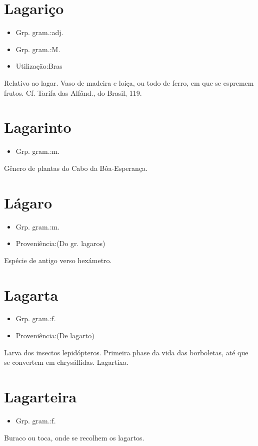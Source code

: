 \section{Lagariço}
\begin{itemize}
\item {Grp. gram.:adj.}
\end{itemize}
\begin{itemize}
\item {Grp. gram.:M.}
\end{itemize}
\begin{itemize}
\item {Utilização:Bras}
\end{itemize}
Relativo ao lagar.
Vaso de madeira e loiça, ou todo de ferro, em que se espremem frutos. Cf. \textunderscore Tarifa das Alfând.\textunderscore , do Brasil, 119.
\section{Lagarinto}
\begin{itemize}
\item {Grp. gram.:m.}
\end{itemize}
Gênero de plantas do Cabo da Bôa-Esperança.
\section{Lágaro}
\begin{itemize}
\item {Grp. gram.:m.}
\end{itemize}
\begin{itemize}
\item {Proveniência:(Do gr. \textunderscore lagaros\textunderscore )}
\end{itemize}
Espécie de antigo verso hexámetro.
\section{Lagarta}
\begin{itemize}
\item {Grp. gram.:f.}
\end{itemize}
\begin{itemize}
\item {Proveniência:(De \textunderscore lagarto\textunderscore )}
\end{itemize}
Larva dos insectos lepidópteros.
Primeira phase da vida das borboletas, até que se convertem em chrysállidas.
Lagartixa.
\section{Lagarteira}
\begin{itemize}
\item {Grp. gram.:f.}
\end{itemize}
Buraco ou toca, onde se recolhem os lagartos.
